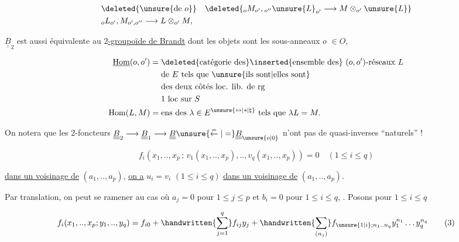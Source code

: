 \[
\begin{aligned}
&\deleted{\unsure{\mathrm{de}\ o}}\quad
\deleted{{}_oM_{o'},{}_{o''}\unsure{L}_{o'}\longrightarrow M\otimes_{o'}\unsure{L}}\\
&{}_oL_{o'},M_{o',o''}\longrightarrow L\otimes_{o'}M,
\end{aligned}
\]

$\underline{\underline B}_2$ est aussi équivalente au \uline{$2$-groupoïde de Brandt} dont les objets sont les sous-anneaux $o$   $\in O$, 

\[
\begin{aligned}
\underline{\mathrm{Hom}}(o,o')={}&\deleted{\text{catégorie des}}\inserted{\text{ensemble des}}\
 (o,o')\text{-réseaux }L\\
&\text{de }E\text{ tels que } \unsure{\text{ils sont}|\text{elles sont}}\\
&\text{des deux côtés loc. lib. de rg}\\
&1\text{ loc sur }S\\
\mathrm{Hom}(L,M)={}&\text{ens des }\lambda\in E^{\unsure{\leftrightarrow|*|\natural}}\text{ tels que }\lambda L=M.
\end{aligned}
\]



On notera que les $2$-foncteurs $\underline{\underline B}_2\longrightarrow\underline{\underline B}_1\longrightarrow\underline{\underline B}\unsure{\overset{=}{\leftarrow}|=}\underline{\underline B}_{\unsure{o|0}}$ n'ont pas de quasi-inverses ``naturels'' !


\[
f_i(x_1,..,x_p\,;\,v_1(x_1,..,x_p),..,v_q(x_1,..,x_p))=0
\quad(1\leq i\leq q)\tag*{(2)}
\]

\uline{dans un voisinage de} $(a_1,..,a_p)$, \uline{on a} $u_i=v_i$ $(1\leq i\leq q)$ \uline{dans un voisinage de} $(a_1,..,a_p)$.

Par tra\handwritten{\unsure{-|{}}}nslation, on peut se ramener au cas où $a_j=0$ pour $1\leq j\leq p$ et $b_i=0$ pour $1\leq i\leq q$, . Posons pour $1\leq i\leq q$

\[
f_i(x_1,..,x_p;y_1,..,y_q)=f_{i0}+
\handwritten{\sum_{j=1}^{q}}f_{ij}y_j+
\handwritten{\sum_{(n_j)}}f_{\unsure{1|i};n_1..n_q}y_1^{n_1}\ldots y_q^{n_q}\tag*{(3)}
\]

